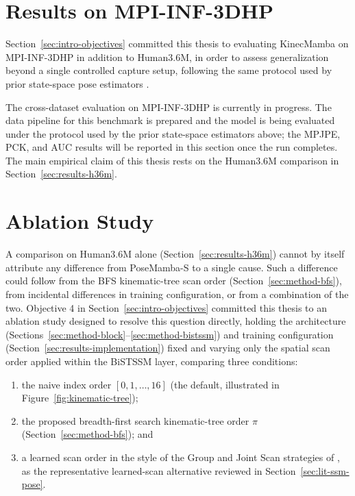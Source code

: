 \section{Results on MPI-INF-3DHP}
\label{sec:results-mpiinf3dhp}

Section~\ref{sec:intro-objectives} committed this thesis to evaluating
KinecMamba on MPI-INF-3DHP \cite{mehta2017mpiinf3dhp} in
addition to Human3.6M, in order to assess generalization beyond a single
controlled capture setup, following the same protocol used by prior
state-space pose estimators
\cite{tang2023stcformer, huang2025posemamba, cui2025sasmamba}.

The cross-dataset evaluation on MPI-INF-3DHP is currently in progress. The
data pipeline for this benchmark is prepared and the model is being evaluated
under the protocol used by the prior state-space estimators above; the MPJPE,
PCK, and AUC results will be reported in this section once the run completes.
The main empirical claim of this thesis rests on the Human3.6M comparison in
Section~\ref{sec:results-h36m}.

\section{Ablation Study}
\label{sec:results-ablation}

A comparison on Human3.6M alone (Section~\ref{sec:results-h36m}) cannot
by itself attribute any difference from PoseMamba-S to a single cause.
Such a difference could follow from the BFS kinematic-tree scan order
(Section~\ref{sec:method-bfs}), from incidental differences in training
configuration, or from a combination of the two.
Objective 4 in Section~\ref{sec:intro-objectives} committed this thesis to
an ablation study designed to resolve this question directly, holding the
architecture (Sections~\ref{sec:method-block}--\ref{sec:method-bistssm})
and training configuration (Section~\ref{sec:results-implementation})
fixed and varying only the spatial scan order applied within the
BiSTSSM layer, comparing three conditions:
\begin{enumerate}
  \item the naive index order $[0, 1, \ldots, 16]$ (the default, illustrated
    in Figure~\ref{fig:kinematic-tree});
  \item the proposed breadth-first search kinematic-tree order $\pi$
    (Section~\ref{sec:method-bfs}); and
  \item a learned scan order in the style of the Group and Joint Scan
    strategies of \cite{nguyen2025skeletonmamba}, as the representative
    learned-scan alternative reviewed in Section~\ref{sec:lit-ssm-pose}.
\end{enumerate}

